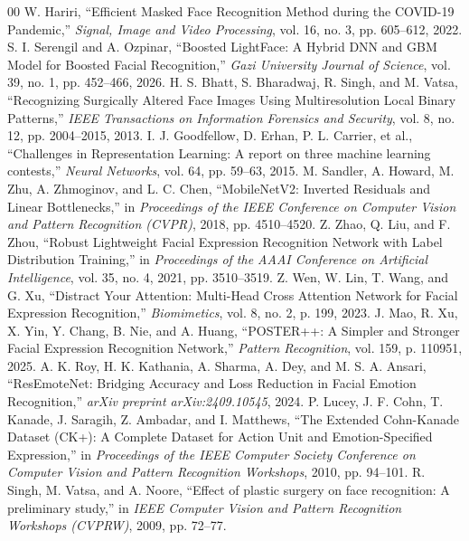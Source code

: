 \documentclass{article} %
\begin{document}
\begin{thebibliography}{00}
 W. Hariri, ``Efficient Masked Face Recognition Method during the COVID-19 Pandemic,'' \textit{Signal, Image and Video Processing}, vol. 16, no. 3, pp. 605--612, 2022.
 S. I. Serengil and A. Ozpinar, ``Boosted LightFace: A Hybrid DNN and GBM Model for Boosted Facial Recognition,'' \textit{Gazi University Journal of Science}, vol. 39, no. 1, pp. 452--466, 2026.
 H. S. Bhatt, S. Bharadwaj, R. Singh, and M. Vatsa, ``Recognizing Surgically Altered Face Images Using Multiresolution Local Binary Patterns,'' \textit{IEEE Transactions on Information Forensics and Security}, vol. 8, no. 12, pp. 2004--2015, 2013.
 I. J. Goodfellow, D. Erhan, P. L. Carrier, et al., ``Challenges in Representation Learning: A report on three machine learning contests,'' \textit{Neural Networks}, vol. 64, pp. 59--63, 2015.
 M. Sandler, A. Howard, M. Zhu, A. Zhmoginov, and L. C. Chen, ``MobileNetV2: Inverted Residuals and Linear Bottlenecks,'' in \textit{Proceedings of the IEEE Conference on Computer Vision and Pattern Recognition (CVPR)}, 2018, pp. 4510--4520.
 Z. Zhao, Q. Liu, and F. Zhou, ``Robust Lightweight Facial Expression Recognition Network with Label Distribution Training,'' in \textit{Proceedings of the AAAI Conference on Artificial Intelligence}, vol. 35, no. 4, 2021, pp. 3510--3519.
 Z. Wen, W. Lin, T. Wang, and G. Xu, ``Distract Your Attention: Multi-Head Cross Attention Network for Facial Expression Recognition,'' \textit{Biomimetics}, vol. 8, no. 2, p. 199, 2023.
 J. Mao, R. Xu, X. Yin, Y. Chang, B. Nie, and A. Huang, ``POSTER++: A Simpler and Stronger Facial Expression Recognition Network,'' \textit{Pattern Recognition}, vol. 159, p. 110951, 2025.
 A. K. Roy, H. K. Kathania, A. Sharma, A. Dey, and M. S. A. Ansari, ``ResEmoteNet: Bridging Accuracy and Loss Reduction in Facial Emotion Recognition,'' \textit{arXiv preprint arXiv:2409.10545}, 2024.
 P. Lucey, J. F. Cohn, T. Kanade, J. Saragih, Z. Ambadar, and I. Matthews, ``The Extended Cohn-Kanade Dataset (CK+): A Complete Dataset for Action Unit and Emotion-Specified Expression,'' in \textit{Proceedings of the IEEE Computer Society Conference on Computer Vision and Pattern Recognition Workshops}, 2010, pp. 94--101.
 R. Singh, M. Vatsa, and A. Noore, ``Effect of plastic surgery on face recognition: A preliminary study,'' in \textit{IEEE Computer Vision and Pattern Recognition Workshops (CVPRW)}, 2009, pp. 72--77.

\end{thebibliography}
\end{document}

